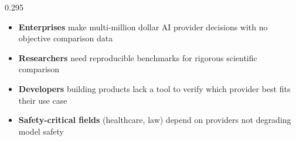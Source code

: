 \documentclass[final]{beamer}
\begin{document}
\begin{frame}[t]
\begin{columns}[T,totalwidth=\linewidth]
\begin{column}{0.295\linewidth}
  \begin{tcolorbox}[sectionbox,title={Why This Matters}]
    {\fontsize{20}{26}\selectfont\color{bodytext}
    \begin{itemize}[leftmargin=1.1cm, itemsep=0.5cm,
                    label={\color{evalgreen}\textbullet}]
      \item \textbf{Enterprises} make multi-million dollar AI
            provider decisions with no objective comparison data
      \item \textbf{Researchers} need reproducible benchmarks for
            rigorous scientific comparison
      \item \textbf{Developers} building products lack a tool to
            verify which provider best fits their use case
      \item \textbf{Safety-critical fields} (healthcare, law)
            depend on providers not degrading model safety
    \end{itemize}
    }
    \vspace{0.35cm}
    \begin{center}
    \end{center}
  \end{tcolorbox}

  \vspace{0.6cm}


\end{column}
\end{columns}
\end{frame}
\end{document}
